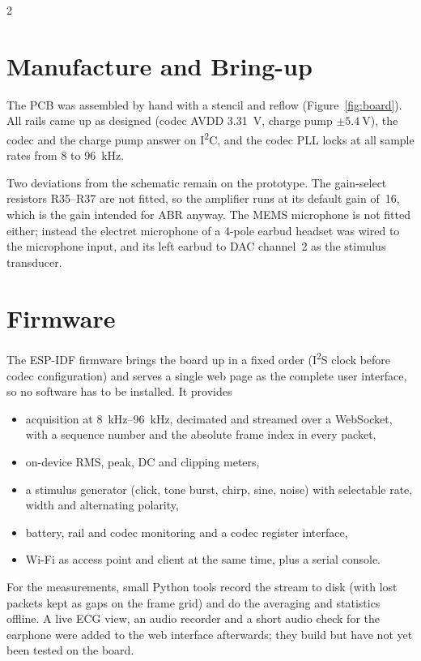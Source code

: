 \documentclass[
	a4paper,english
]{MFETechnicalReport}
\begin{document}
\begin{multicols}{2}
\section{Manufacture and Bring-up}

The PCB was assembled by hand with a stencil and reflow (Figure~\ref{fig:board}). All rails came up as designed (codec AVDD \SI{3.31}{\volt}, charge pump $\pm\SI{5.4}{\volt}$), the codec and the charge pump answer on I\textsuperscript{2}C, and the codec PLL locks at all sample rates from 8 to \SI{96}{\kilo\hertz}.

Two deviations from the schematic remain on the prototype. The gain-select resistors R35--R37 are not fitted, so the amplifier runs at its default gain of~16, which is the gain intended for ABR anyway. The MEMS microphone is not fitted either; instead the electret microphone of a 4-pole earbud headset was wired to the microphone input, and its left earbud to DAC channel~2 as the stimulus transducer.

\section{Firmware}

The ESP-IDF firmware brings the board up in a fixed order (I\textsuperscript{2}S clock before codec configuration) and serves a single web page as the complete user interface, so no software has to be installed. It provides
\begin{itemize}
	\item acquisition at \SIrange{8}{96}{\kilo\hertz}, decimated and streamed over a WebSocket, with a sequence number and the absolute frame index in every packet,
	\item on-device RMS, peak, DC and clipping meters,
	\item a stimulus generator (click, tone burst, chirp, sine, noise) with selectable rate, width and alternating polarity,
	\item battery, rail and codec monitoring and a codec register interface,
	\item Wi-Fi as access point and client at the same time, plus a serial console.
\end{itemize}
For the measurements, small Python tools record the stream to disk (with lost packets kept as gaps on the frame grid) and do the averaging and statistics offline. A live ECG view, an audio recorder and a short audio check for the earphone were added to the web interface afterwards; they build but have not yet been tested on the board.


\end{multicols}
\end{document}
